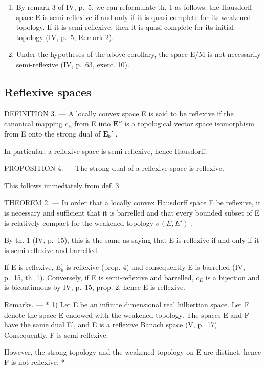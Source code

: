 \begin{enumerate}
\def\labelenumi{\arabic{enumi})}
\setcounter{enumi}{1}
\item
  By remark 3 of IV, p.~5, we can reformulate th. 1 as follows: the Hausdorff space E is semi-reflexive if and only if it is quasi-complete for its weakened topology. If it is semi-reflexive, then it is quasi-complete for its initial topology (IV, p.~5, Remark 2).
\item
  Under the hypotheses of the above corollary, the space E/M is not necessarily semi-reflexive (IV, p.~63, exerc. 10).
\end{enumerate}

\subsection{Reflexive spaces}

DEFINITION 3. --- A locally convex space E is said to be reflexive if the canonical mapping \(c_{\mathrm{E}}\) from E into \(\mathbf{E}''\) is a topological vector space isomorphism from E onto the strong dual of \(\mathbf{E}_b'\) .

In particular, a reflexive space is semi-reflexive, hence Hausdorff.

PROPOSITION 4. --- The strong dual of a reflexive space is reflexive.

This follows immediately from def. 3.

THEOREM 2. --- In order that a locally convex Hausdorff space E be reflexive, it is necessary and sufficient that it is barrelled and that every bounded subset of E is relatively compact for the weakened topology \(\sigma(E, E')\) .

By th. 1 (IV, p.~15), this is the same as saying that E is reflexive if and only if it is semi-reflexive and barrelled.

If E is reflexive, \(E_{b}^{\prime}\) is reflexive (prop. 4) and consequently E is barrelled (IV, p.~15, th. 1). Conversely, if E is semi-reflexive and barrelled, \(c_{E}\) is a bijection and is bicontinuous by IV, p.~15, prop. 2, hence E is reflexive.

Remarks. --- * 1) Let E be an infinite dimensional real hilbertian space. Let F denote the space E endowed with the weakened topology. The spaces E and F have the same dual E', and E is a reflexive Banach space (V, p.~17). Consequently, F is semi-reflexive.

However, the strong topology and the weakened topology on E are distinct, hence F is not reflexive. *

